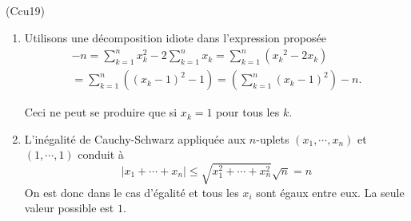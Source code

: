\begin{tiny}(Ccu19)\end{tiny}
\begin{enumerate}
  \item Utilisons une décomposition idiote dans l'expression proposée
\begin{multline*}
  -n = \sum_{k=1}^nx^2_k -2\sum_{k=1}^nx_k 
  = \sum_{k=1}^n({x_k}^2 - 2x_k) \\
  = \sum_{k=1}^n\left( (x_k - 1)^2 - 1\right)
  = \left( \sum_{k=1}^n(x_k - 1)^2\right)  - n.
\end{multline*}

Ceci ne peut se produire que si $x_k = 1$ pour tous les $k$.
  \item L'inégalité de Cauchy-Schwarz appliquée aux $n$-uplets $(x_1,\cdots,x_n)$ et $(1,\cdots,1)$ conduit à
\begin{displaymath}
\left| x_1+\cdots+x_n\right|\leq 
\sqrt{x^2_1+\cdots+x^2_n} \sqrt{n} = n 
\end{displaymath}
On est donc dans le cas d'égalité et tous les $x_i$ sont égaux entre eux. La seule valeur possible est $1$. 
\end{enumerate}
